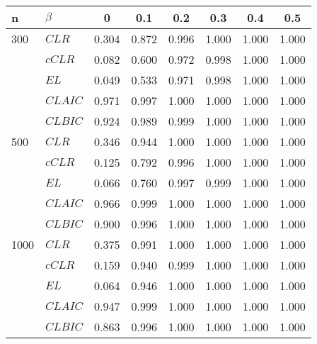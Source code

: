 \begin{tabular} 
 {l l |  *{6}{c} } 
n & $\beta$ & 0  &  0.1 & 0.2 & 0.3 & 0.4 & 0.5\\ \hline \hline 
300 & $CLR$& 0.304 &0.872 &0.996 &1.000 &1.000 &1.000 \\ 
& $cCLR$& 0.082 &0.600 &0.972 &0.998 &1.000 &1.000 \\ 
 & $EL$& 0.049 &0.533 &0.971 &0.998 &1.000 &1.000 \\ 
 & $CLAIC$& 0.971 &0.997 &1.000 &1.000 &1.000 &1.000 \\ 
 & $CLBIC$& 0.924 &0.989 &0.999 &1.000 &1.000 &1.000 \\ \hline \hline 
500 & $CLR$& 0.346 &0.944 &1.000 &1.000 &1.000 &1.000 \\ 
 & $cCLR$& 0.125 &0.792 &0.996 &1.000 &1.000 &1.000 \\ 
 & $EL$& 0.066 &0.760 &0.997 &0.999 &1.000 &1.000 \\ 
 & $CLAIC$& 0.966 &0.999 &1.000 &1.000 &1.000 &1.000 \\ 
 & $CLBIC$& 0.900 &0.996 &1.000 &1.000 &1.000 &1.000 \\ \hline \hline 
1000 & $CLR$& 0.375 &0.991 &1.000 &1.000 &1.000 &1.000 \\ 
 & $cCLR$& 0.159 &0.940 &0.999 &1.000 &1.000 &1.000 \\ 
 & $EL$& 0.064 &0.946 &1.000 &1.000 &1.000 &1.000 \\ 
 & $CLAIC$& 0.947 &0.999 &1.000 &1.000 &1.000 &1.000 \\ 
 & $CLBIC$& 0.863 &0.996 &1.000 &1.000 &1.000 &1.000 \\ \hline 
\hline 
 \end{tabular} 
